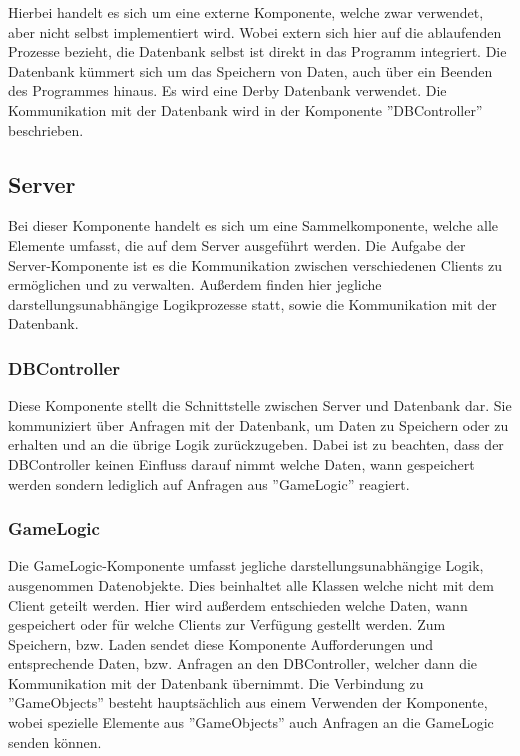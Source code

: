 \documentclass[fontsize=12pt,paper=a4,twoside]{scrartcl}
\begin{document}
Hierbei handelt es sich um eine externe Komponente, welche zwar verwendet, aber nicht selbst implementiert wird. Wobei extern sich hier auf die ablaufenden Prozesse bezieht, die Datenbank selbst ist direkt in das Programm integriert. Die Datenbank kümmert sich um das Speichern von Daten, auch über ein Beenden des Programmes hinaus. Es wird eine Derby Datenbank verwendet. Die Kommunikation mit der Datenbank wird in der Komponente ''DBController'' beschrieben. 

\subsection{Server}

Bei dieser Komponente handelt es sich um eine Sammelkomponente, welche alle Elemente umfasst, die auf dem Server ausgeführt werden. Die Aufgabe der Server-Komponente ist es die Kommunikation zwischen verschiedenen Clients zu ermöglichen und zu verwalten. Außerdem finden hier jegliche darstellungsunabhängige Logikprozesse statt, sowie die Kommunikation mit der Datenbank. 

\subsubsection{DBController}

Diese Komponente stellt die Schnittstelle zwischen Server und Datenbank dar. Sie kommuniziert über Anfragen mit der Datenbank, um Daten zu Speichern oder zu erhalten und an die übrige Logik zurückzugeben. Dabei ist zu beachten, dass der DBController keinen Einfluss darauf nimmt welche Daten, wann gespeichert werden sondern lediglich auf Anfragen aus ''GameLogic'' reagiert.

\subsubsection{GameLogic}

Die GameLogic-Komponente umfasst jegliche darstellungsunabhängige Logik, ausgenommen Datenobjekte. Dies beinhaltet alle Klassen welche nicht mit dem Client geteilt werden. Hier wird außerdem entschieden welche Daten, wann gespeichert oder für welche Clients zur Verfügung gestellt werden. Zum Speichern, bzw. Laden sendet diese Komponente Aufforderungen und entsprechende Daten, bzw. Anfragen an den DBController, welcher dann die Kommunikation mit der Datenbank übernimmt. Die Verbindung zu ''GameObjects'' besteht hauptsächlich aus einem Verwenden der Komponente, wobei spezielle Elemente aus ''GameObjects'' auch Anfragen an die GameLogic senden können.
\end{document}
